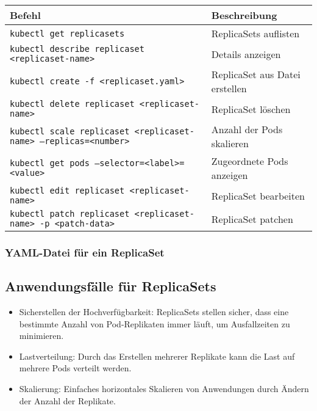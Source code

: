 \noindent
\begin{tabular}{|p{}|p{}|}
\hline
\textbf{Befehl} & \textbf{Beschreibung} \\
\hline
\texttt{kubectl get replicasets} & ReplicaSets auflisten \\
\texttt{kubectl describe replicaset <replicaset-name>} & Details anzeigen \\
\texttt{kubectl create -f <replicaset.yaml>} & ReplicaSet aus Datei erstellen \\
\texttt{kubectl delete replicaset <replicaset-name>} & ReplicaSet löschen \\
\texttt{kubectl scale replicaset <replicaset-name> --replicas=<number>} & Anzahl der Pods skalieren \\
\texttt{kubectl get pods --selector=<label>=<value>} & Zugeordnete Pods anzeigen \\
\texttt{kubectl edit replicaset <replicaset-name>} & ReplicaSet bearbeiten \\
\texttt{kubectl patch replicaset <replicaset-name> -p <patch-data>} & ReplicaSet patchen \\
\hline
\end{tabular}
\newpage
\subsubsection{YAML-Datei für ein ReplicaSet}


\subsection{Anwendungsfälle für ReplicaSets}
\begin{itemize}
    \item Sicherstellen der Hochverfügbarkeit: ReplicaSets stellen sicher, dass eine bestimmte Anzahl von Pod-Replikaten immer läuft, um Ausfallzeiten zu minimieren.
    \item Lastverteilung: Durch das Erstellen mehrerer Replikate kann die Last auf mehrere Pods verteilt werden.
    \item Skalierung: Einfaches horizontales Skalieren von Anwendungen durch Ändern der Anzahl der Replikate.
\end{itemize}

